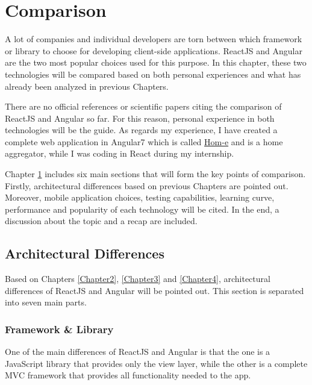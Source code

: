 
\chapter{Comparison} %
\label{Chapter5} %

A lot of companies and individual developers are torn between which framework or library to choose for developing client-side applications. ReactJS and Angular are the two most popular choices used for this purpose. In this chapter, these two technologies will be compared based on both personal experiences and what has already been analyzed in previous Chapters. \par

There are no official references or scientific papers citing the comparison of ReactJS and Angular so far. For this reason, personal experience in both technologies will be the guide. As regards my experience, I have created a complete web application in Angular7 which is called \href{https://snf-844240.vm.okeanos.grnet.gr/#/index}{Hom-e} and is a home aggregator, while I was coding in React during my internship. \par

Chapter \ref{Chapter5} includes six main sections that will form the key points of comparison. Firstly, architectural differences based on previous Chapters are pointed out. Moreover, mobile application choices, testing capabilities, learning curve, performance and popularity of each technology will be cited. In the end, a discussion about the topic and a recap are included. \par

\section{Architectural Differences}

Based on Chapters \ref{Chapter2}, \ref{Chapter3} and \ref{Chapter4}, architectural differences of ReactJS and Angular will be pointed out. This section is separated into seven main parts. \par

\subsection{Framework \& Library}

One of the main differences of ReactJS and Angular is that the one is a JavaScript library that provides only the view layer, while the other is a complete MVC framework that provides all functionality needed to the app. \par

